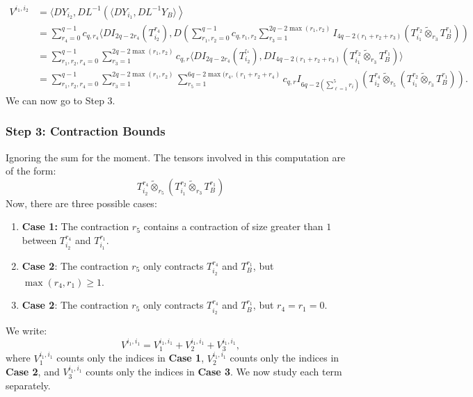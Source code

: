 \documentclass[]{article}
\numberwithin{equation}{section}
\theoremstyle{definition}
\begin{document}
\begin{align}
    V^{i_1,i_2} & =\langle DY_{i_2}, DL^{-1} \left ( \langle DY_{i_1}, DL^{-1}Y_{B}\rangle \right \rangle \\
    & = \sum_{r_{4} = 0}^{q-1} c_{q,r_{4}}\langle D I_{2q-2r_{4}}(T_{i_2}^{r_4}), D \left ( \sum_{r_1,r_2 = 0}^{q-1} c_{q,r_{1},r_{2}} \sum_{r_3=1}^{2q-2\max(r_1, r_2)}I_{4q-2(r_1 + r_2 + r_3)}(T^{r_2}_{i_1} \tilde{\otimes}_{r_3}T^{r_1}_{B})\right ) \\
    & = \sum_{r_1, r_2, r_4 = 0}^{q-1} \sum_{r_3=1}^{2q-2\max(r_1, r_2)}c_{q,r} \langle D I_{2q-2r_{4}}(T_{i_2}^{^{r_4}}), D I_{4q-2(r_1 + r_2 + r_3)}(T^{r_2}_{i_1} \tilde{\otimes}_{r_3}T^{r_1}_{B})\rangle \\
    & =  \sum_{r_1, r_2, r_4 = 0}^{q-1} \sum_{r_3=1}^{2q-2\max(r_1, r_2)}\sum_{r_5=1}^{6q-2\max(r_4,(r_1 +r_2 + r_4)}c_{q,r}I_{6q-2(\sum_{\ell =1}^{5} r_i)} \left ( T_{i_2}^{r_4} \tilde{\otimes}_{r_5} \left ( T^{r_2}_{i_1} \tilde{\otimes}_{r_3}T^{r_1}_{B}\right )\right ).
\end{align}
We can now go to Step 3.
\subsubsection{Step 3: Contraction Bounds}
Ignoring the sum for the moment. The tensors involved in this computation are of the form:
\begin{equation}
    T_{i_2}^{r_4} \tilde{\otimes}_{r_5} \left ( T^{r_2}_{i_1} \tilde{\otimes}_{r_3}T^{r_1}_{B} \right )
\end{equation}
Now, there are three possible cases:
\begin{enumerate}
    \item \textbf{Case 1:} The contraction $r_5$ contains a contraction of size greater than $1$ between $T_{i_2}^{r_4}$ and $T^{r_1}_{i_1}$. 
    \item \textbf{Case 2}: The contraction $r_5$ only contracts $T_{i_2}^{r_4}$ and $T^{r_1}_{B}$, but $\max(r_4, r_1) \geq 1$. 
    \item \textbf{Case 2}: The contraction $r_5$ only contracts $T_{i_2}^{r_4}$ and $T^{r_1}_{B}$, but $r_4= r_1 = 0$.
\end{enumerate}
We write: 
\begin{equation}
    V^{i_1,i_1} = V_1^{i_1,i_1}+ V_2^{i_1,i_1} + V_3^{i_1,i_1},
\end{equation}
 where $V_{1}^{i_1,i_1}$ counts only the indices in \textbf{Case 1}, $V_2^{i_1,i_1}$ counts only the indices in \textbf{Case 2}, and $V_{3}^{i_1,i_1}$ counts only the indices in \textbf{Case 3}. We now study each term separately. \\
\end{document}
